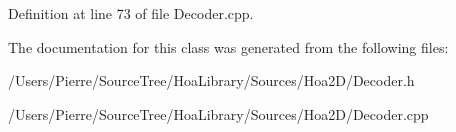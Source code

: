Definition at line 73 of file Decoder.\-cpp.



The documentation for this class was generated from the following files\-:\begin{DoxyCompactItemize}
\item 
/\-Users/\-Pierre/\-Source\-Tree/\-Hoa\-Library/\-Sources/\-Hoa2\-D/Decoder.\-h\item 
/\-Users/\-Pierre/\-Source\-Tree/\-Hoa\-Library/\-Sources/\-Hoa2\-D/Decoder.\-cpp\end{DoxyCompactItemize}
